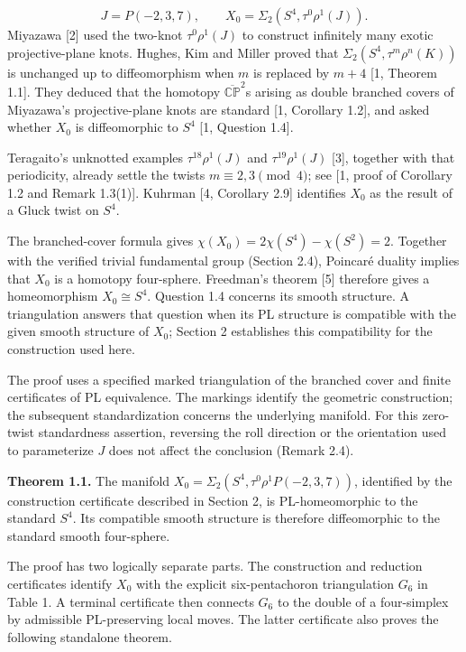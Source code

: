 \documentclass[11pt,letterpaper]{article}
\begin{document}
\[
J=P(-2,3,7),\qquad X_0=\Sigma_2\!\left(S^4,\tau^0\rho^1(J)\right).
\]
Miyazawa [2] used the two-knot $\tau^0\rho^1(J)$ to construct infinitely many exotic projective-plane knots. Hughes, Kim and Miller proved that $\Sigma_2(S^4,\tau^m\rho^n(K))$ is unchanged up to diffeomorphism when $m$ is replaced by $m+4$ [1, Theorem 1.1]. They deduced that the homotopy $\overline{\mathbb{CP}}^{2}$s arising as double branched covers of Miyazawa's projective-plane knots are standard [1, Corollary 1.2], and asked whether $X_0$ is diffeomorphic to $S^4$ [1, Question 1.4].

Teragaito's unknotted examples $\tau^{18}\rho^1(J)$ and $\tau^{19}\rho^1(J)$ [3], together with that periodicity, already settle the twists $m\equiv2,3\pmod4$; see [1, proof of Corollary 1.2 and Remark 1.3(1)]. Kuhrman [4, Corollary 2.9] identifies $X_0$ as the result of a Gluck twist on $S^4$.

The branched-cover formula gives $\chi(X_0)=2\chi(S^4)-\chi(S^2)=2$. Together with the verified trivial fundamental group (Section 2.4), Poincaré duality implies that $X_0$ is a homotopy four-sphere. Freedman's theorem [5] therefore gives a homeomorphism $X_0\cong S^4$. Question 1.4 concerns its smooth structure. A triangulation answers that question when its PL structure is compatible with the given smooth structure of $X_0$; Section 2 establishes this compatibility for the construction used here.

The proof uses a specified marked triangulation of the branched cover and finite certificates of PL equivalence. The markings identify the geometric construction; the subsequent standardization concerns the underlying manifold. For this zero-twist standardness assertion, reversing the roll direction or the orientation used to parameterize $J$ does not affect the conclusion (Remark 2.4).

\medskip\noindent\textbf{Theorem 1.1.} The manifold $X_0=\Sigma_2(S^4,\tau^0\rho^1P(-2,3,7))$, identified by the construction certificate described in Section 2, is PL-homeomorphic to the standard $S^4$. Its compatible smooth structure is therefore diffeomorphic to the standard smooth four-sphere.

The proof has two logically separate parts. The construction and reduction certificates identify $X_0$ with the explicit six-pentachoron triangulation $G_6$ in Table 1. A terminal certificate then connects $G_6$ to the double of a four-simplex by admissible PL-preserving local moves. The latter certificate also proves the following standalone theorem.
\end{document}
